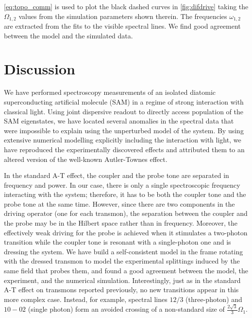 \documentclass[%
 pra,
 amsmath,amssymb,
 reprint,%
]{revtex4-1}
\begin{document}
\autoref{eq:topo_comm} is used to plot the black 
dashed curves in \autoref{fig:difdrive} taking 
the $\Omega_{1,2}$ values from the simulation 
parameters shown therein. The frequencies 
$\omega_{1,2}$ are extracted from the fits to the 
visible spectral lines. We find good agreement 
between the model and the simulated data.


\section{Discussion}

We have performed spectroscopy measurements of an 
isolated diatomic superconducting artificial 
molecule (SAM) in a regime of strong interaction 
with classical light. Using joint dispersive 
readout to directly access population of the SAM 
eigenstates, we have located several anomalies in 
the spectral data that were impossible to explain 
using the unperturbed model of the system. By 
using extensive numerical modelling explicitly 
including the interaction with light, we have 
reproduced the experimentally discovered effects 
and attributed them to an altered version of the 
well-known Autler-Townes effect.

In the standard A-T effect, the coupler and the 
probe tone are separated in frequency and power. 
In our case, there is only a single spectroscopic 
frequency interacting with the system; therefore, 
it has to be both the coupler tone and the probe 
tone at the same time. However, since there are 
two components in the driving operator (one for 
each transmon), the separation between the 
coupler and the probe may be in the Hilbert space 
rather than in frequency. Moreover, the 
effectively weak driving for the probe is 
achieved when it stimulates a two-photon 
transition while the coupler tone is resonant 
with a single-photon one and is dressing the 
system. We have build a self-consistent model in 
the frame rotating with the dressed transmon to 
model the experimental splittings induced by the 
same field that probes them, and found a good 
agreement between the model, the experiment, and 
the numerical simulation. Interestingly, just as 
in the standard A-T effect on transmons reported 
previously, no new transitions appear in this 
more complex case. Instead, for example, spectral 
lines $12/3$ (three-photon) and $10-02$ (single 
photon) form an avoided crossing of a 
non-standard size of $\frac{2\sqrt{3}}{3} 
\Omega_1$.
\end{document}
